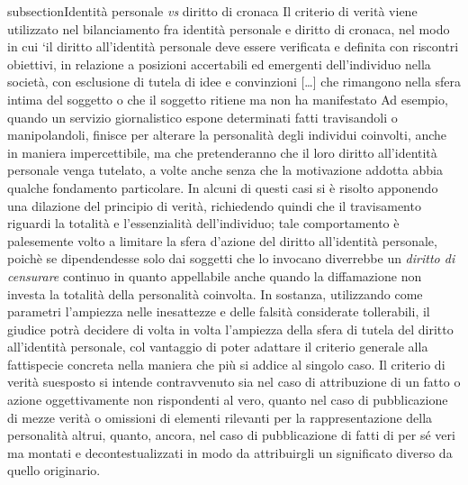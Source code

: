 subsection{Identità personale \textit{vs} diritto di cronaca}
Il criterio di verità viene utilizzato nel bilanciamento fra identità personale e diritto di cronaca, nel modo in cui ‘il diritto all’identità personale deve essere verificata e definita con riscontri obiettivi, in relazione a posizioni accertabili ed emergenti dell’individuo nella società, con esclusione di tutela di idee e convinzioni […] che rimangono nella sfera intima del soggetto o che il soggetto ritiene ma non ha manifestato
Ad esempio, quando un servizio giornalistico espone determinati fatti travisandoli o manipolandoli, finisce per alterare la personalità degli individui coinvolti, anche in maniera impercettibile, ma che pretenderanno che il loro diritto all'identità personale venga tutelato, a volte anche senza che la motivazione addotta abbia qualche fondamento particolare. In alcuni di questi casi si è risolto apponendo una dilazione del principio di verità, richiedendo quindi che il travisamento riguardi la totalità e l’essenzialità dell'individuo; tale comportamento è palesemente volto a limitare la sfera d’azione del diritto all’identità personale, poichè se dipendendesse solo dai soggetti che lo invocano diverrebbe un \textit{diritto di censurare} continuo in quanto appellabile anche quando la diffamazione non investa la totalità della personalità coinvolta.
In sostanza, utilizzando come parametri l’ampiezza nelle inesattezze e delle falsità considerate tollerabili, il giudice potrà decidere di volta in volta l’ampiezza della sfera di tutela del diritto all’identità personale, col vantaggio di poter adattare il criterio generale alla fattispecie concreta nella maniera che più si addice al singolo caso.
Il criterio di verità suesposto si intende contravvenuto sia nel caso di attribuzione di un fatto o azione oggettivamente non rispondenti al vero, quanto nel caso di pubblicazione di mezze verità o omissioni di elementi rilevanti per la rappresentazione della personalità altrui, quanto, ancora, nel caso di pubblicazione di fatti di per sé veri ma montati e decontestualizzati in modo da attribuirgli un significato diverso da quello originario.
